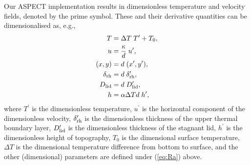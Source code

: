 Our ASPECT implementation 
results in dimensionless temperature and velocity fields, denoted by the prime symbol. These and their derivative quantities can be dimensionalised as, e.g.,
\begin{align}
    \begin{split} \label{eq:dimensionalise}
    T &= \Delta T \; T^\prime + T_0, \\
    u &= \frac{\kappa}{d} \; u^\prime, \\
    (x, y) &= d \; (x^\prime, y^\prime), \\
    \delta_{\rm rh} &= d \; \delta_{\rm rh}^\prime, \\
    D_{\rm lid} &= d \; D_{\rm lid}^\prime, \\
    h &= \alpha \Delta T d \; h^\prime,
    \end{split}
\end{align}
where $T^\prime$ is the dimensionless temperature, $u^\prime$ is the horizontal component of the dimensionless velocity, $\delta_{\rm rh}^\prime$ is the dimensionless thickness of the upper thermal boundary layer, $D_{\rm lid}^\prime$ is the dimensionless thickness of the stagnant lid, $h^\prime$ is the dimensionless height of topography, $T_0$ is the dimensional surface temperature, $\Delta T$ is the dimensional temperature difference from bottom to surface, and the other (dimensional) parameters are defined under (\ref{eq:Ra}) above. 

